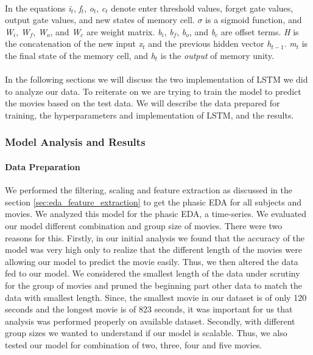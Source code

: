 \paragraph{} In the equations \textit{i$_{t}$}, \textit{f$_{t}$}, \textit{o$_{t}$}, \textit{c$_{t}$} denote enter threshold values, forget gate values, output gate values, and new states of memory cell. $\sigma$ is a sigmoid function, and \textit{W$_{i}$}, \textit{W$_{f}$}, \textit{W$_{o}$}, and \textit{W$_{c}$} are weight matrix. \textit{b$_{i}$}, \textit{b$_{f}$}, \textit{b$_{o}$}, and \textit{b$_{c}$} are offset terms. \textit{H} is the concatenation of the new input \textit{x$_{t}$} and the previous hidden vector \textit{h$_{t-1}$}. \textit{m$_{t}$} is the final state of the memory cell, and \textit{h$_{t}$} is the \textit{output} of memory unity.

\paragraph{} In the following sections we will discuss the two implementation of LSTM we did to analyze our data. To reiterate on we are trying to train the model to predict the movies based on the test data. We will describe the data prepared for training, the hyperparameters and implementation of LSTM, and the results.

\subsubsection{Model Analysis and Results}

\paragraph{Data Preparation} We performed the filtering, scaling and feature extraction as discussed in the section \ref{sec:eda_feature_extraction} to get the phasic EDA for all subjects and movies. We analyzed this model for the phasic EDA, a time-series. We evaluated our model different combination and group size of movies. There were two reasons for this. Firstly, in our initial analysis we found that the accuracy of the model was very high only to realize that the different length of the movies were allowing our model to predict the movie easily. Thus, we then altered the data fed to our model. We considered the smallest length of the data under scrutiny for the group of movies and pruned the beginning part other data to match the data with smallest length. Since, the smallest movie in our dataset is of only 120 seconds and the longest movie is of 823 seconds, it was important for us that analysis was performed properly on available dataset. Secondly, with different group sizes we wanted to understand if our model is scalable. Thus, we also tested our model for combination of two, three, four and five movies. 

